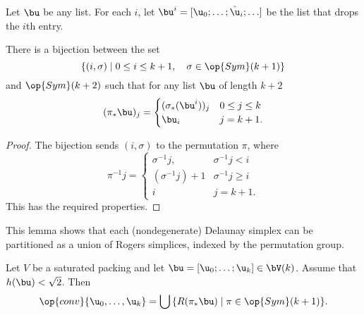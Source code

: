 \begin{definition}
Let $\bu$ be any list.
For each $i$,  let
$\bu^i = [\u_0;\ldots;\hat\u_i;\ldots]$ be the list that drops the $i$th entry.
\end{definition}

\begin{lemma}
\label{lemma:coset-bijection} 
There is a bijection between the set 
\[  
\{(i,\sigma)\mid 0\le i\le k+1,\quad \sigma\in \op{Sym}(k+1)\}
\] 
and $\op{Sym}(k+2)$ such that for any list $\bu$ of length $k+2$
\[
(\pi_*\bu)_j = \begin{cases} (\sigma_*(\bu^i))_j&0\le j \le k\\
  \bu_i & j=k+1.
\end{cases}
\]
\end{lemma}

\begin{proof} 
The bijection sends $(i,\sigma)$ to the permutation $\pi$, where
\[  
\pi^{-1} j = \begin{cases} 
\sigma^{-1} j, & \sigma^{-1} j<i\\
(\sigma^{-1}j)+1 & \sigma^{-1} j \ge i\\
i& j=k+1.
\end{cases}
\] 
This has the required properties.
\end{proof}

This lemma shows that each (nondegenerate) Delaunay simplex can be
partitioned as a union of Rogers simplices, indexed by the permutation
group.

\begin{lemma}\label{lemma:Rconv}  
  Let $V$ be a saturated packing and let $\bu = [\u_0;\ldots;\u_k]\in
  \bV(k)$.  Assume that $h(\bu)<\sqrt2$.  
  Then
\[  
\op{conv}\{ \u_0,\ldots, \u_k\} = \bigcup \,\{ R(\pi_*\bu) \mid \pi\in \op{Sym}(k+1)\}.
\] 
\end{lemma}
%

